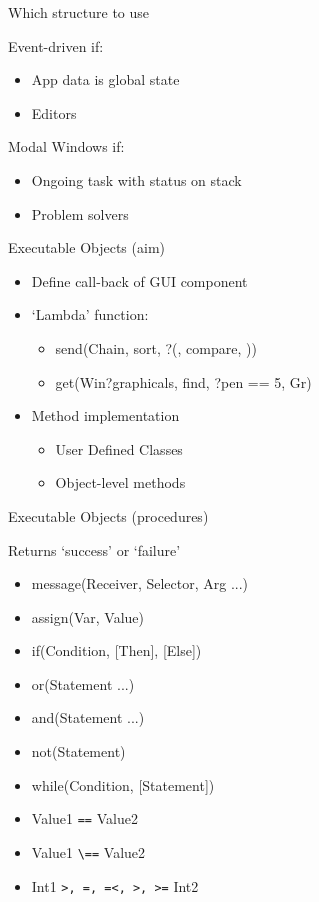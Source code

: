 \begin{sli}{Which structure to use}

Event-driven if:

\begin{itemize}
    \item App data is global state
    \item Editors
\end{itemize}

Modal Windows if:

\begin{itemize}
    \item Ongoing task with status on stack
    \item Problem solvers
\end{itemize}
\end{sli}


\begin{sli}{Executable Objects (aim)}
\begin{itemize}
    \item Define call-back of GUI component
    \item `Lambda' function:
    \begin{itemize}
        \item send(Chain, sort, ?(, compare, ))
	\item get(Win?graphicals, find, ?pen == 5, Gr)
    \end{itemize}
    \item Method implementation
    \begin{itemize}
        \item User Defined Classes
	\item Object-level methods
    \end{itemize}
\end{itemize}
\end{sli}

\begin{sli}{Executable Objects (procedures)}

Returns `success' or `failure'

\begin{itemize}
    \item message(Receiver, Selector, Arg ...)
    \item assign(Var, Value)
    \item if(Condition, [Then], [Else])
    \item or(Statement ...)
    \item and(Statement ...)
    \item not(Statement)
    \item while(Condition, [Statement])
    \item Value1 \verb$==$ Value2
    \item Value1 \verb$\==$ Value2
    \item Int1 \verb$>, =, =<, >, >=$ Int2
\end{itemize}
\end{sli}


